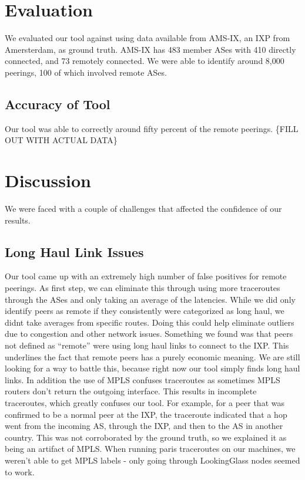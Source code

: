 \documentclass{acm_proc_article-sp}
\begin{document}
\section{Evaluation}
\label{sec:evaluation}
We evaluated our tool against using data available from AMS-IX, an IXP from Amersterdam, as ground truth.
AMS-IX has 483 member ASes with 410 directly connected, and 73 remotely connected.
We were able to identify around 8,000 peerings, 100 of which involved remote ASes.
\subsection{Accuracy of Tool}
Our tool was able to correctly around fifty percent of the remote peerings.
\{FILL OUT WITH ACTUAL DATA\}
\section{Discussion}
We were faced with a couple of challenges that affected the confidence of our results.
\subsection{Long Haul Link Issues}
Our tool came up with an extremely high number of false positives for remote peerings. As first step, we can eliminate this
through using more traceroutes through the ASes and only taking an average of the latencies. While we did only identify peers as 
remote if they consistently were categorized as long haul, we didnt take averages from specific routes. Doing this could help eliminate 
outliers due to congestion and other network issues. Something we found was that peers not defined as ``remote'' were using long haul links
to connect to the IXP. This underlines the fact that remote peers has a purely economic meaning. We are still looking for a way to battle this,
because right now our tool simply finds long haul links. In addition the use of MPLS confuses traceroutes as sometimes MPLS routers don't 
return the outgoing interface. This results in incomplete traceroutes, which greatly confuses our tool. For example, for a peer that was confirmed to be 
a normal peer at the IXP, the traceroute indicated that a hop went from the incoming AS, through the IXP, and then to the AS in another country. This was not corroborated by the ground truth, so we explained it as being
an artifact of MPLS. When running paris traceroutes on our machines, we weren't able to get
MPLS labels - only going through LookingGlass nodes seemed to work. 
\end{document}
